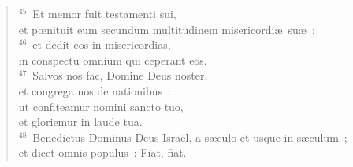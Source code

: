 \begin{flushleft}
\begin{verse}
${}^{45}$~Et memor fuit testamenti sui,\\ et pœnituit eum secundum multitudinem misericordi\ae\ su\ae~:\\
${}^{46}$~et dedit eos in misericordias,\\ in conspectu omnium qui ceperant eos.\\
${}^{47}$~Salvos nos fac, Domine Deus noster,\\ et congrega nos de nationibus~:\\ ut confiteamur nomini sancto tuo,\\ et gloriemur in laude tua.\\
${}^{48}$~Benedictus Dominus Deus Isra\"el, a s\ae culo et usque in s\ae culum~;\\ et dicet omnis populus~: Fiat, fiat.\end{verse}\end{flushleft}



